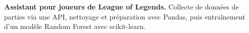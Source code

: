 
\begin{cvparagraph}
\noindent\textbf{Assistant pour joueurs de League of Legends.} Collecte de données de parties via une API, nettoyage et préparation avec Pandas, puis entraînement d’un modèle Random Forest avec scikit-learn.
\end{cvparagraph}
